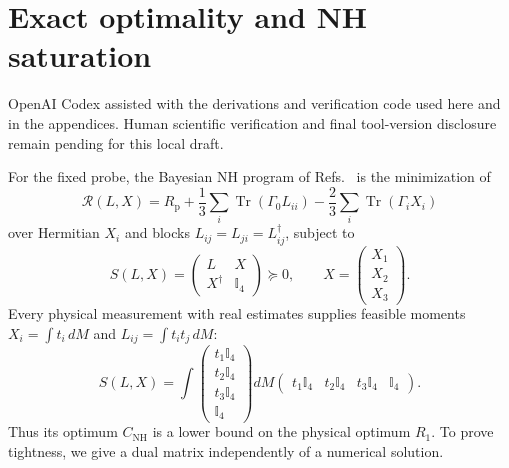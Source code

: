 \documentclass[aps,pra,reprint,amsmath,amssymb,nofootinbib,longbibliography,floatfix]{revtex4-2}
\newcommand{\Tr}{\operatorname{Tr}}
\newcommand{\I}{\mathbb{I}}
\begin{document}
\section{Exact optimality and NH saturation}
OpenAI Codex assisted with the derivations and verification code used here
and in the appendices. Human scientific verification and final tool-version
disclosure remain pending for this local draft.

For the fixed probe, the Bayesian NH program of Refs.~\cite{Suzuki2024,Bia2026}
is the minimization of
\begin{equation}
 \mathcal R(L,X)=R_{\mathrm p}
 +\frac13\sum_i\Tr(\Gamma_0 L_{ii})
 -\frac23\sum_i\Tr(\Gamma_i X_i)
 \label{eq:nhobj}
\end{equation}
over Hermitian $X_i$ and blocks $L_{ij}=L_{ji}=L_{ij}^\dagger$, subject to
\begin{equation}
 S(L,X)=\begin{pmatrix}L&X\\X^\dagger&\I_4\end{pmatrix}\succeq0,
 \qquad X=\begin{pmatrix}X_1\\X_2\\X_3\end{pmatrix}.
 \label{eq:schur}
\end{equation}
Every physical measurement with real estimates supplies feasible moments
$X_i=\int t_i\,dM$ and $L_{ij}=\int t_it_j\,dM$:
\begin{equation}
 S(L,X)=\int
 \begin{pmatrix}t_1\I_4\\t_2\I_4\\t_3\I_4\\\I_4\end{pmatrix}
 dM
 \begin{pmatrix}t_1\I_4&t_2\I_4&t_3\I_4&\I_4\end{pmatrix}.
 \label{eq:physicalgram}
\end{equation}
Thus its optimum $C_{\mathrm{NH}}$ is a lower bound on the physical
optimum $R_1$. To prove tightness, we give a dual matrix independently
of a numerical solution.
\end{document}
